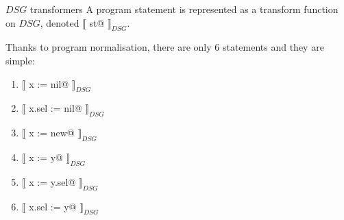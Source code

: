 \documentclass[xcolor={usenames,dvipsnames}]{beamer}
\makeatletter
\newcommand{\transformer}[2]{$\llbracket$ \lstinline@#1@ $\rrbracket_{#2}$}
\newcommand{\transformerDSG}[1]{\transformer{#1}{DSG}}
\makeatother
\begin{document}
\begin{frame}[fragile]{$DSG$ transformers}
  A program statement is represented as a transform function on $DSG$, denoted \transformerDSG{st}.

  \vspace{1em}

  Thanks to program normalisation, there are only 6 statements and they are simple:

  \begin{enumerate}
  \item \transformerDSG{x := nil}
  \item \transformerDSG{x.sel := nil}
  \item \transformerDSG{x := new}
  \item \transformerDSG{x := y}
  \item \transformerDSG{x := y.sel}
  \item \transformerDSG{x.sel := y}
  \end{enumerate}
\end{frame}
\end{document}

